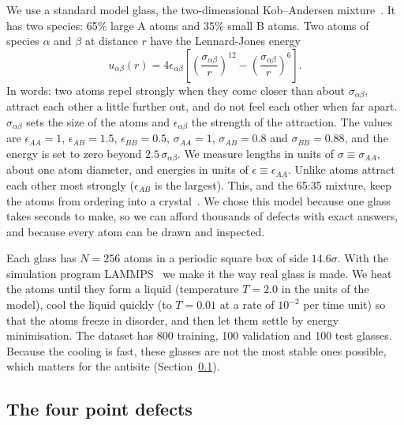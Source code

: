 \documentclass[10pt]{article}
\begin{document}
We use a standard model glass, the two-dimensional Kob--Andersen mixture~\citep{kob1995,bruning2009}. It has two species: 65\% large A atoms and 35\% small B atoms. Two atoms of species $\alpha$ and $\beta$ at distance $r$ have the Lennard-Jones energy
\begin{equation}
u_{\alpha\beta}(r)=4\epsilon_{\alpha\beta}\left[\left(\frac{\sigma_{\alpha\beta}}{r}\right)^{12}-\left(\frac{\sigma_{\alpha\beta}}{r}\right)^{6}\right].
\end{equation}
In words: two atoms repel strongly when they come closer than about $\sigma_{\alpha\beta}$, attract each other a little further out, and do not feel each other when far apart. $\sigma_{\alpha\beta}$ sets the size of the atoms and $\epsilon_{\alpha\beta}$ the strength of the attraction. The values are $\epsilon_{AA}=1$, $\epsilon_{AB}=1.5$, $\epsilon_{BB}=0.5$, $\sigma_{AA}=1$, $\sigma_{AB}=0.8$ and $\sigma_{BB}=0.88$, and the energy is set to zero beyond $2.5\,\sigma_{\alpha\beta}$. We measure lengths in units of $\sigma\equiv\sigma_{AA}$, about one atom diameter, and energies in units of $\epsilon\equiv\epsilon_{AA}$. Unlike atoms attract each other most strongly ($\epsilon_{AB}$ is the largest). This, and the 65:35 mixture, keep the atoms from ordering into a crystal~\citep{bruning2009}. We chose this model because one glass takes seconds to make, so we can afford thousands of defects with exact answers, and because every atom can be drawn and inspected.

Each glass has $N=256$ atoms in a periodic square box of side $14.6\sigma$. With the simulation program LAMMPS~\citep{thompson2022lammps} we make it the way real glass is made. We heat the atoms until they form a liquid (temperature $T=2.0$ in the units of the model), cool the liquid quickly (to $T=0.01$ at a rate of $10^{-2}$ per time unit) so that the atoms freeze in disorder, and then let them settle by energy minimisation. The dataset has 800 training, 100 validation and 100 test glasses. Because the cooling is fast, these glasses are not the most stable ones possible, which matters for the antisite (Section~\ref{sec:defects}).

\subsection{The four point defects}
\label{sec:defects}
\end{document}
